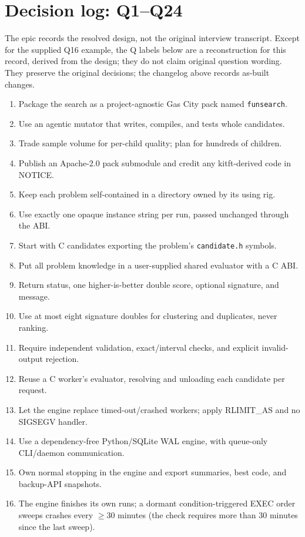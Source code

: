 \documentclass[11pt]{article}
\newcommand{\code}[1]{\texttt{#1}}
\begin{document}
\section{Decision log: Q1--Q24}
The epic records the resolved design, not the original interview transcript.
Except for the supplied Q16 example, the Q labels below are a reconstruction
for this record, derived from the design; they do not claim original question wording.
They preserve the original decisions; the changelog above records as-built changes.
\begin{enumerate}
\renewcommand{\labelenumi}{Q\arabic{enumi}:}
\item Package the search as a project-agnostic Gas City pack named \code{funsearch}.
\item Use an agentic mutator that writes, compiles, and tests whole candidates.
\item Trade sample volume for per-child quality; plan for hundreds of children.
\item Publish an Apache-2.0 pack submodule and credit any kitft-derived code in NOTICE.
\item Keep each problem self-contained in a directory owned by its using rig.
\item Use exactly one opaque instance string per run, passed unchanged through the ABI.
\item Start with C candidates exporting the problem's \code{candidate.h} symbols.
\item Put all problem knowledge in a user-supplied shared evaluator with a C ABI.
\item Return status, one higher-is-better double score, optional signature, and message.
\item Use at most eight signature doubles for clustering and duplicates, never ranking.
\item Require independent validation, exact/interval checks, and explicit invalid-output rejection.
\item Reuse a C worker's evaluator, resolving and unloading each candidate per request.
\item Let the engine replace timed-out/crashed workers; apply RLIMIT\_AS and no SIGSEGV handler.
\item Use a dependency-free Python/SQLite WAL engine, with queue-only CLI/daemon communication.
\item Own normal stopping in the engine and export summaries, best code, and backup-API snapshots.
\item The engine finishes its own runs; a dormant condition-triggered EXEC order sweeps crashes every $\geq$30 minutes (the check requires more than 30 minutes since the last sweep).

\end{enumerate}
\end{document}
